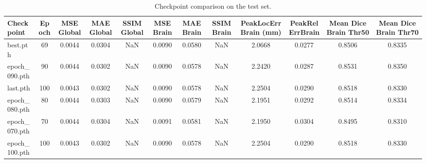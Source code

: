 \begin{table}
\caption{Checkpoint comparison on the test set.}
\label{tab:checkpoint_ranking}
\begin{tabular}{lccccccccccc}
\toprule
Checkpoint & Epoch & MSE Global & MAE Global & SSIM Global & MSE Brain & MAE Brain & SSIM Brain & PeakLocErrBrain (mm) & PeakRelErrBrain & Mean Dice Brain Thr50 & Mean Dice Brain Thr70 \\
\midrule
best.pth & 69 & 0.0044 & 0.0304 & NaN & 0.0090 & 0.0580 & NaN & 2.0668 & 0.0277 & 0.8506 & 0.8335 \\
epoch_090.pth & 90 & 0.0044 & 0.0302 & NaN & 0.0090 & 0.0578 & NaN & 2.2420 & 0.0287 & 0.8531 & 0.8350 \\
last.pth & 100 & 0.0043 & 0.0302 & NaN & 0.0090 & 0.0578 & NaN & 2.2504 & 0.0290 & 0.8518 & 0.8330 \\
epoch_080.pth & 80 & 0.0044 & 0.0303 & NaN & 0.0090 & 0.0579 & NaN & 2.1951 & 0.0292 & 0.8514 & 0.8334 \\
epoch_070.pth & 70 & 0.0044 & 0.0304 & NaN & 0.0091 & 0.0581 & NaN & 2.1950 & 0.0304 & 0.8495 & 0.8310 \\
epoch_100.pth & 100 & 0.0043 & 0.0302 & NaN & 0.0090 & 0.0578 & NaN & 2.2504 & 0.0290 & 0.8518 & 0.8330 \\
\bottomrule
\end{tabular}
\end{table}
